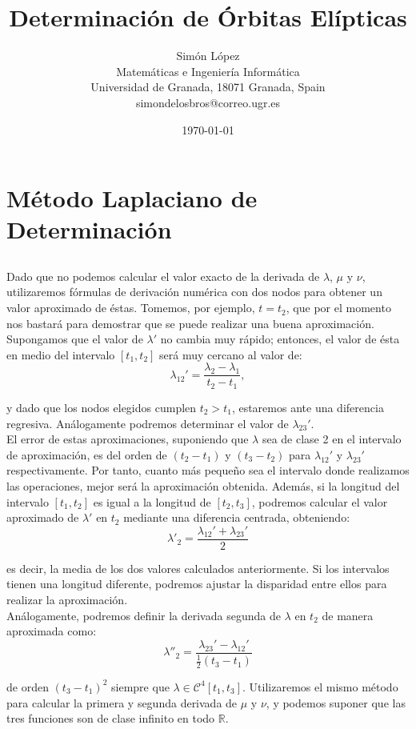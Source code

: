 \documentclass[11pt]{article}
\title{Determinación de Órbitas Elípticas}
\author{Simón López
\\
{\small Matemáticas e Ingeniería Informática}
\\
{\small Universidad de Granada, 18071 Granada, Spain}
\\
{\small simondelosbros@correo.ugr.es}}
\date{\today}
\begin{document}
\section{Método Laplaciano de Determinación}

\subsection{}
\label{subsec:primera_segunda_derivada}
Dado que no podemos calcular el valor exacto de la derivada de $\lambda$, $\mu$ y $\nu$, utilizaremos fórmulas de derivación numérica con dos nodos para obtener un valor aproximado de éstas. Tomemos, por ejemplo, $t=t_2$, que por el momento nos bastará para demostrar que se puede realizar una buena aproximación. Supongamos que el valor de $\lambda'$ no cambia muy rápido; entonces, el valor de ésta en medio del intervalo $[t_1,t_2]$ será muy cercano al valor de:
\[
\lambda_{12}'=\frac{\lambda_2-\lambda_1}{t_2-t_1},
\]

\noindent y dado que los nodos elegidos cumplen $t_2>t_1$, estaremos ante una diferencia regresiva. Análogamente podremos determinar el valor de $\lambda_{23}'$.\\

El error de estas aproximaciones, suponiendo que $\lambda$ sea de clase 2 en el intervalo de aproximación, es del orden de $(t_2-t_1)$ y $(t_3-t_2)$ para $\lambda_{12}'$ y $\lambda_{23}'$ respectivamente. Por tanto, cuanto más pequeño sea el intervalo donde realizamos las operaciones, mejor será la aproximación obtenida. Además, si la longitud del intervalo $[t_1,t_2]$ es igual a la longitud de $[t_2,t_3]$, podremos calcular el valor aproximado de $\lambda'$ en $t_2$ mediante una diferencia centrada, obteniendo:
\[
\lambda'_2=\frac{\lambda_{12}'+\lambda_{23}'}{2}
\]

\noindent es decir, la media de los dos valores calculados anteriormente. Si los intervalos tienen una longitud diferente, podremos ajustar la disparidad entre ellos para realizar la aproximación.\\

Análogamente, podremos definir la derivada segunda de $\lambda$ en $t_2$ de manera aproximada como:
\[
\lambda''_2=\frac{\lambda_{23}'-\lambda_{12}'}{\frac{1}{2}(t_3-t_1)}
\]

\noindent de orden $(t_3-t_1)^2$ siempre que $\lambda\in\mathcal{C}^4[t_1,t_3]$. Utilizaremos el mismo método para calcular la primera y segunda derivada de $\mu$ y $\nu$, y podemos suponer que las tres funciones son de clase infinito en todo $\mathbb{R}$.\\
\end{document}
